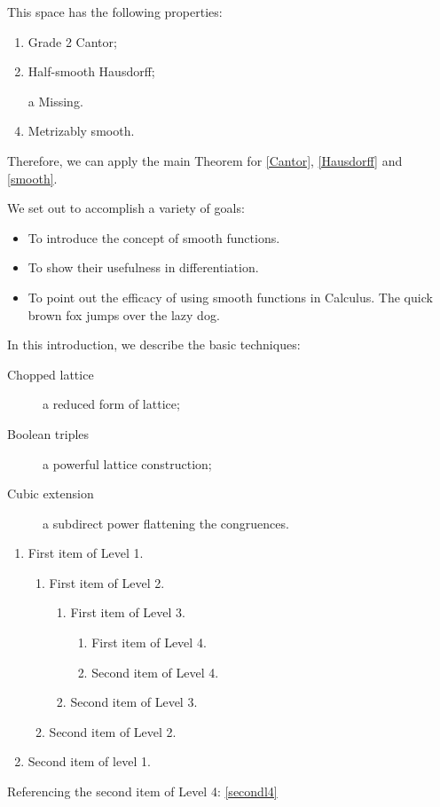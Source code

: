 \documentclass{amsart}
\begin{document}
\noindent
This space has the following properties:
\begin{enumerate}
    \item Grade 2 Cantor\label{Cantor};
    \item Half-smooth Hausdorff\label{Hausdorff};
    \item[a] Missing\label{david}.
    \item Metrizably smooth\label{smooth}.
\end{enumerate}
Therefore, we can apply the main Theorem for \ref{Cantor}, \ref{Hausdorff} and \ref{smooth}.

\medskip
\noindent
We set out to accomplish a variety of goals:
\begin{itemize}
    \item To introduce the concept of smooth functions.
    \item To show their usefulness in differentiation.
    \item To point out the efficacy of using smooth functions in Calculus. The quick
        brown fox jumps over the lazy dog.
\end{itemize}

\medskip
\noindent
In this introduction, we describe the basic techniques:
\begin{description}
    \item[Chopped lattice] a reduced form of lattice;
    \item[Boolean triples] a powerful lattice construction;
    \item[Cubic extension] a subdirect power flattening the congruences.
\end{description}

\medskip
\begin{enumerate}
    \item First item of Level 1.
        \begin{enumerate}
            \item First item of Level 2.
                \begin{enumerate}
                    \item First item of Level 3.
                        \begin{enumerate}
                            \item First item of Level 4.
                            \item Second item of Level 4.\label{secondl4}
                        \end{enumerate}
                    \item Second item of Level 3.
                \end{enumerate}
            \item Second item of Level 2.
        \end{enumerate}
    \item Second item of level 1.
\end{enumerate}
Referencing the second item of Level 4: \ref{secondl4}
\end{document}
